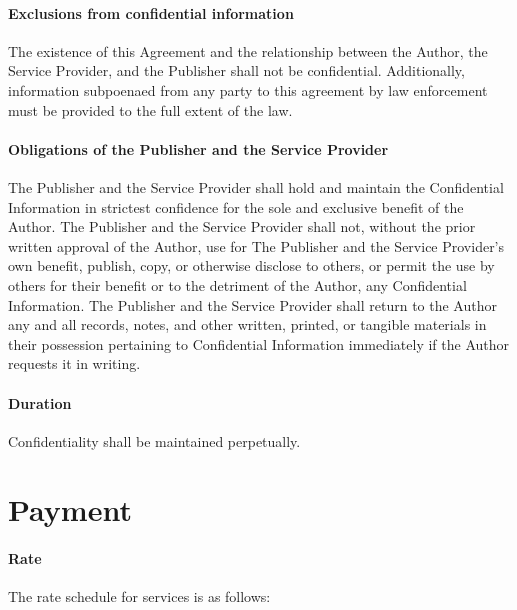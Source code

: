 \documentclass[12pt,letterpaper,oneside]{article}
\begin{document}
\paragraph{Exclusions from confidential information}

The existence of this Agreement and the relationship between the Author, the Service Provider, and the Publisher shall not be confidential. Additionally, information subpoenaed from any party to this agreement by law enforcement must be provided to the full extent of the law.

\paragraph{Obligations of the Publisher and the Service Provider}

The Publisher and the Service Provider shall hold and maintain the Confidential Information in strictest confidence for the sole and exclusive benefit of the Author. The Publisher and the Service Provider shall not, without the prior written approval of the Author, use for The Publisher and the Service Provider’s own benefit, publish, copy, or otherwise disclose to others, or permit the use by others for their benefit or to the detriment of the Author, any Confidential Information. The Publisher and the Service Provider shall return to the Author any and all records, notes, and other written, printed, or tangible materials in their possession pertaining to Confidential Information immediately if the Author requests it in writing.

\paragraph{Duration}

Confidentiality shall be maintained perpetually.

\section{Payment}

\paragraph{Rate}

The rate schedule for services is as follows:

\vspace{1ex}
\end{document}
